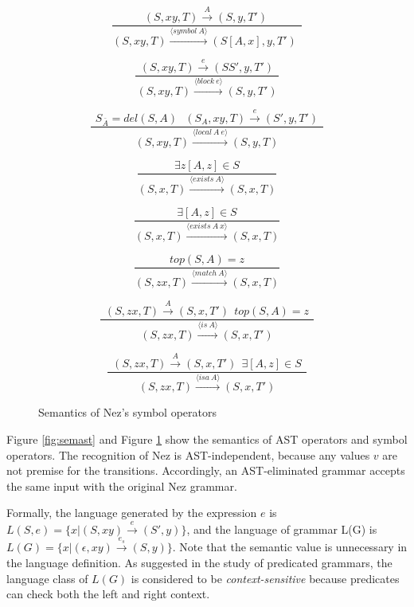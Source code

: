 \documentclass[preprint]{sigplanconf}
\begin{document}
\begin{figure}[bt]
\begin{small}
 \vspace{-3mm}
\[
\frac{~ (S, xy, T) \xrightarrow{A} (S, y, T')~~}
{(S, xy, T) \xrightarrow{\langle symbol~A\rangle} (S [A,x], y, T')~~}
\]

 \vspace{-3mm}
\[
\frac{~~ (S, xy, T) \xrightarrow{e} (S S', y, T')~~}{(S, xy, T) \xrightarrow{\langle block~e\rangle} (S, y, T')}
\]

\[
\frac{~~ S_{\bar{A}} = del(S,A) ~~~ (S_A, xy, T) \xrightarrow{e} (S', y, T') ~~}
{(S, xy, T) \xrightarrow{\langle local~A~e\rangle} (S, y, T)}
\]

 \vspace{-3mm}
\[
\frac{~~ \exists z [A,z] \in S ~~} {(S, x, T) \xrightarrow{\langle exists~A\rangle} (S, x, T)}
\]

 \vspace{-3mm}
\[
\frac{~~ \exists [A,z] \in S ~~} 
{(S, x, T) \xrightarrow{\langle exists~A~x\rangle} (S, x,T)}
\]

 \vspace{-3mm}
\[
\frac{~~  top(S,A) = z ~~ }{(S, zx, T) \xrightarrow{\langle match~A\rangle} (S, x, T)}
\]

 \vspace{-3mm}
\[
\frac{~~ (S, zx, T) \xrightarrow{A} (S, x, T') ~~ top(S,A) = z ~~ }
{(S, zx, T) \xrightarrow{\langle is~A\rangle} (S, x, T')}
\]

 \vspace{-3mm}
\[
\frac{~~ (S, zx, T) \xrightarrow{A} (S, x, T') ~~ \exists [A,z] \in S~~}
{(S, zx, T) \xrightarrow{\langle isa~A \rangle} (S, x, T')}
\]
\end{small}
\caption{Semantics of Nez's symbol operators}
\label{fig:semsym}
\end{figure}

Figure \ref{fig:semast} and Figure \ref{fig:semsym} show the semantics of AST operators and symbol operators. The recognition of Nez is AST-independent, because any values $v$ are not premise for the transitions. Accordingly, an AST-eliminated grammar accepts the same input with the original Nez grammar. 

Formally, the language generated by the expression $e$ is $L(S, e) = \{ x | (S, xy) \xrightarrow{e} (S', y) \}$, and the language of grammar L(G) is $L(G) = \{ x | (\epsilon, xy) \xrightarrow{e_s} (S, y) \}$. Note that the semantic value is unnecessary in the language definition. As suggested in the study of predicated grammars\cite{PLDI11_Antlr}, the language class of $L(G)$ is considered to be {\em context-sensitive} because predicates can check both the left and right context. 
\end{document}
